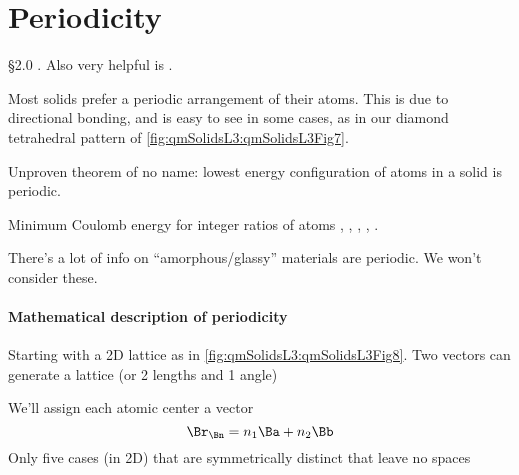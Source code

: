 %
%
%
\section{Periodicity}

\reading \S 2.0 \citep{ibach2009solid}.  Also very helpful is \citep{tung:bravais}.

Most solids prefer a periodic arrangement of their atoms.  This is due to directional bonding, and is easy to see in some cases, as in our diamond tetrahedral pattern of \cref{fig:qmSolidsL3:qmSolidsL3Fig7}.
%

Unproven theorem of no name: lowest energy configuration of atoms in a solid is periodic.

Minimum Coulomb energy for integer ratios of atoms
,
,
,
,
.

There's a lot of info on ``amorphous/glassy'' materials are  periodic.  We won't consider these.
%
\paragraph{Mathematical description of periodicity}

Starting with a 2D lattice as in \cref{fig:qmSolidsL3:qmSolidsL3Fig8}.  Two vectors can generate a lattice (or 2 lengths and 1 angle)
%

We'll assign each atomic center a vector
%
\begin{dmath}\label{eqn:condensedMatterLecture3:100}
\Br_\Bn = n_1 \Ba + n_2 \Bb
\end{dmath}
%
Only five cases (in 2D) that are symmetrically distinct that leave no spaces


